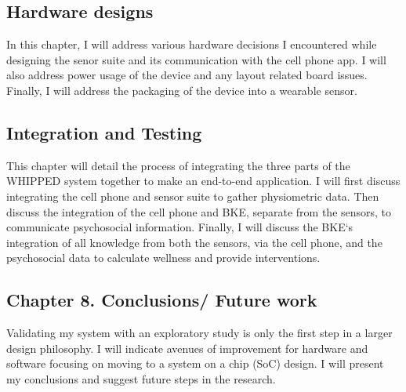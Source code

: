 \subsection{ Hardware designs}
\label{subsec:Chapter5HardwareDesigns}
In this chapter, I will address various hardware decisions I encountered while designing the senor suite and its communication with the cell phone app. I will also address power usage of the device and any layout related board issues. Finally, I will address the packaging of the device into a wearable sensor.

\subsection{ Integration and Testing}
\label{subsec:Chapter6IntegrationAndTesting}
This chapter will detail the process of integrating the three parts of the WHIPPED system together to make an end-to-end application. I will first discuss integrating the cell phone and sensor suite to gather physiometric data. Then discuss the integration of the cell phone and BKE, separate from the sensors, to communicate psychosocial information. Finally, I will discuss the BKE‘s integration of all knowledge from both the sensors, via the cell phone, and the psychosocial data to calculate wellness and provide interventions.
%

\subsection{Chapter 8. Conclusions/ Future work}
\label{subsec:Chapter8Conclusions}
Validating my system with an exploratory study is only the first step in a larger design philosophy. I will indicate avenues of improvement for hardware and software focusing on moving to a system on a chip (SoC) design. I will present my conclusions and suggest future steps in the research.

\fi
